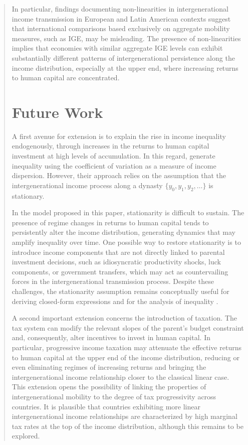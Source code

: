 \documentclass[12pt]{article}
\begin{document}
\begin{abstract}
In particular, findings documenting non-linearities in intergenerational income transmission in European and Latin American contexts suggest that international comparisons based exclusively on aggregate mobility measures, such as IGE, may be misleading. The presence of non-linearities implies that economies with similar aggregate IGE levels can exhibit substantially different patterns of intergenerational persistence along the income distribution, especially at the upper end, where increasing returns to human capital are concentrated.


\section{Future Work}

A first avenue for extension is to explain the rise in income inequality endogenously, through increases in the returns to human capital investment at high levels of accumulation. In this regard, \textcite{Becker_Tomes_1979} generate inequality using the coefficient of variation as a measure of income dispersion. However, their approach relies on the assumption that the intergenerational income process along a dynasty $\{y_0, y_1, y_2, \ldots\}$ is stationary.

In the model proposed in this paper, stationarity is difficult to sustain. The presence of regime changes in returns to human capital tends to persistently alter the income distribution, generating dynamics that may amplify inequality over time. One possible way to restore stationarity is to introduce income components that are not directly linked to parental investment decisions, such as idiosyncratic productivity shocks, luck components, or government transfers, which may act as countervailing forces in the intergenerational transmission process. Despite these challenges, the stationarity assumption remains conceptually useful for deriving closed-form expressions and for the analysis of inequality \parencite{Becker_Tomes_1979,Solon_1999,Solon_2004,Bratsberg_2007}.

A second important extension concerns the introduction of taxation. The tax system can modify the relevant slopes of the parent’s budget constraint and, consequently, alter incentives to invest in human capital. In particular, progressive income taxation may attenuate the effective returns to human capital at the upper end of the income distribution, reducing or even eliminating regimes of increasing returns and bringing the intergenerational income relationship closer to the classical linear case. This extension opens the possibility of linking the properties of intergenerational mobility to the degree of tax progressivity across countries. It is plausible that countries exhibiting more linear intergenerational income relationships are characterized by high marginal tax rates at the top of the income distribution, although this remains to be explored.


\end{abstract}
\end{document}
